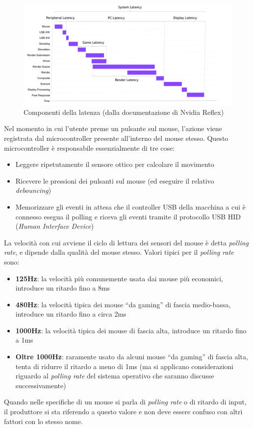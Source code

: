 \begin{figure}[h]
	\centering
	\includegraphics[width=\textwidth]{Introduzione_files/nvidia_latencypipeline.png}
	\caption{Componenti della latenza (dalla documentazione di Nvidia Reflex)}
	\label{fig:nvidia_latencypipeline}
\end{figure}

Nel momento in cui l'utente preme un pulsante sul mouse, l'azione viene registrata dal microcontroller presente all'interno del mouse stesso. Questo microcontroller è responsabile essenzialmente di tre cose:\begin{itemize}
	\item Leggere ripetutamente il sensore ottico per calcolare il movimento
	\item Ricevere le pressioni dei pulsanti sul mouse (ed eseguire il relativo \textit{debouncing})
	\item Memorizzare gli eventi in attesa che il controller USB della macchina a cui è connesso esegua il polling e riceva gli eventi tramite il protocollo USB HID (\textit{Human Interface Device})\cite{usb_hid}
\end{itemize}
La velocità con cui avviene il ciclo di lettura dei sensori del mouse è detta \textit{polling rate}, e dipende dalla qualità del mouse stesso. Valori tipici per il \textit{polling rate} sono:
\begin{itemize}
	\item \textbf{125Hz}: la velocità più comunemente usata dai mouse più economici, introduce un ritardo fino a 8ms
	\item \textbf{480Hz}: la velocità tipica dei mouse ``da gaming'' di fascia medio-bassa, introduce un ritardo fino a circa 2ms
	\item \textbf{1000Hz}: la velocità tipica dei mouse di fascia alta, introduce un ritardo fino a 1ms
	\item \textbf{Oltre 1000Hz}: raramente usato da alcuni mouse ``da gaming'' di fascia alta, tenta di ridurre il ritardo a meno di 1ms (ma si applicano considerazioni riguardo al \textit{polling rate} del sistema operativo che saranno discusse successivamente)
\end{itemize}
Quando nelle specifiche di un mouse si parla di \textit{polling rate} o di ritardo di input, il produttore si sta riferendo a questo valore e non deve essere confuso con altri fattori con lo stesso nome.

